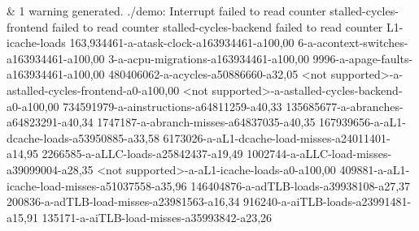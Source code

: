 &
1 warning generated. ./demo: Interrupt failed to read counter stalled-cycles-frontend failed to read counter stalled-cycles-backend failed to read counter L1-icache-loads 163,934461-a-atask-clock-a163934461-a100,00 6-a-acontext-switches-a163934461-a100,00 3-a-acpu-migrations-a163934461-a100,00 9996-a-apage-faults-a163934461-a100,00 480406062-a-acycles-a50886660-a32,05 <not supported>-a-astalled-cycles-frontend-a0-a100,00 <not supported>-a-astalled-cycles-backend-a0-a100,00 734591979-a-ainstructions-a64811259-a40,33 135685677-a-abranches-a64823291-a40,34 1747187-a-abranch-misses-a64837035-a40,35 167939656-a-aL1-dcache-loads-a53950885-a33,58 6173026-a-aL1-dcache-load-misses-a24011401-a14,95 2266585-a-aLLC-loads-a25842437-a19,49 1002744-a-aLLC-load-misses-a39099004-a28,35 <not supported>-a-aL1-icache-loads-a0-a100,00 409881-a-aL1-icache-load-misses-a51037558-a35,96 146404876-a-adTLB-loads-a39938108-a27,37 200836-a-adTLB-load-misses-a23981563-a16,34 916240-a-aiTLB-loads-a23991481-a15,91 135171-a-aiTLB-load-misses-a35993842-a23,26
